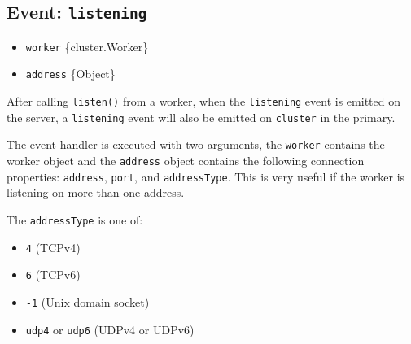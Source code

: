\subsection{\texorpdfstring{Event:
\texttt{\textquotesingle{}listening\textquotesingle{}}}{Event: \textquotesingle listening\textquotesingle{}}}\label{event-listening-1}

\begin{itemize}
\tightlist
\item
  \texttt{worker} \{cluster.Worker\}
\item
  \texttt{address} \{Object\}
\end{itemize}

After calling \texttt{listen()} from a worker, when the
\texttt{\textquotesingle{}listening\textquotesingle{}} event is emitted
on the server, a \texttt{\textquotesingle{}listening\textquotesingle{}}
event will also be emitted on \texttt{cluster} in the primary.

The event handler is executed with two arguments, the \texttt{worker}
contains the worker object and the \texttt{address} object contains the
following connection properties: \texttt{address}, \texttt{port}, and
\texttt{addressType}. This is very useful if the worker is listening on
more than one address.

\begin{Shaded}
\begin{Highlighting}[]
\NormalTok{(}\OperatorTok{,}\OperatorTok{,}\KeywordTok{=\textgreater{}}\NormalTok{ \{}
  \NormalTok{(}
    \SpecialCharTok{$\{}\SpecialCharTok{\}}\VerbatimStringTok{:}\SpecialCharTok{$\{}\SpecialCharTok{\}}\VerbatimStringTok{\textasciigrave{}}\NormalTok{)}\OperatorTok{;}
\NormalTok{\})}\OperatorTok{;}
\end{Highlighting}
\end{Shaded}

The \texttt{addressType} is one of:

\begin{itemize}
\tightlist
\item
  \texttt{4} (TCPv4)
\item
  \texttt{6} (TCPv6)
\item
  \texttt{-1} (Unix domain socket)
\item
  \texttt{\textquotesingle{}udp4\textquotesingle{}} or
  \texttt{\textquotesingle{}udp6\textquotesingle{}} (UDPv4 or UDPv6)
\end{itemize}

